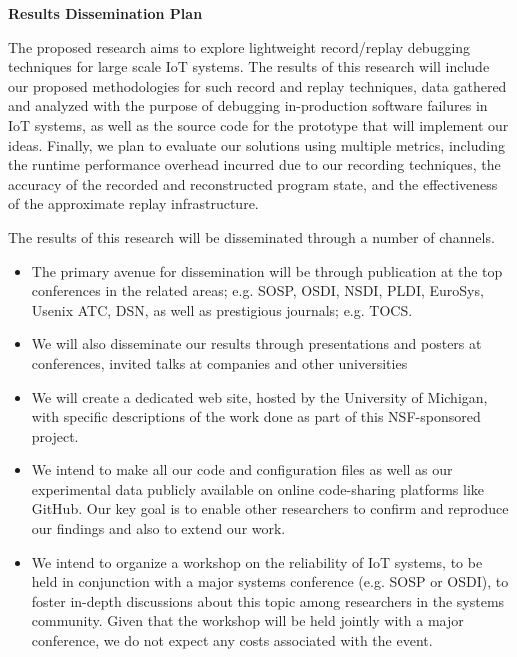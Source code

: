 \documentclass{article}
\begin{document}
\begin{center}
\Large
\bfseries
Results Dissemination Plan
\end{center}
The proposed research aims to explore lightweight record/replay debugging techniques for large scale IoT systems. The results of this research will include our proposed methodologies for such record and replay techniques, data gathered and analyzed with the purpose of debugging in-production software failures in IoT systems, as well as the source code for the prototype that will implement our ideas. Finally, we plan to evaluate our solutions using multiple metrics, including the runtime performance overhead incurred due to our recording techniques, the accuracy of the recorded and reconstructed program state, and the effectiveness of the approximate replay infrastructure. 

The results of this research will be disseminated through a number of channels. 
\begin{itemize}
\item The primary avenue for dissemination will be through publication at the top conferences in the related areas; e.g. SOSP, OSDI, NSDI, PLDI, EuroSys, Usenix ATC, DSN, as well as prestigious journals; e.g. TOCS. 
\item We will also disseminate our results through presentations and posters at conferences, invited talks at companies and other universities
\item We will create a dedicated web site, hosted by the University of Michigan, with specific descriptions of the work done as part of this NSF-sponsored project. 
\item We intend to make all our code and configuration files as well as our experimental data publicly available on online code-sharing platforms like GitHub. Our key goal is to enable other researchers to confirm and reproduce our findings and also to extend our work.
\item	We intend to organize a workshop on the reliability of IoT systems, to be held in conjunction with a major systems conference (e.g. SOSP or OSDI), to foster in-depth discussions about this topic among researchers in the systems community. Given that the workshop will be held jointly with a major conference, we do not expect any costs associated with the event. 
\end{itemize}
\end{document}
